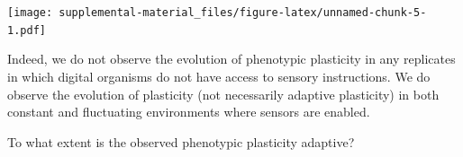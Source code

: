 \documentclass[]{book}
\newenvironment{Shaded}{\begin{snugshade}}{\end{snugshade}}
\newcommand{\DataTypeTok}[1]{\textcolor[rgb]{0.13,0.29,0.53}{#1}}
\newcommand{\FloatTok}[1]{\textcolor[rgb]{0.00,0.00,0.81}{#1}}
\newcommand{\KeywordTok}[1]{\textcolor[rgb]{0.13,0.29,0.53}{\textbf{#1}}}
\newcommand{\NormalTok}[1]{#1}
\newcommand{\OperatorTok}[1]{\textcolor[rgb]{0.81,0.36,0.00}{\textbf{#1}}}
\newcommand{\StringTok}[1]{\textcolor[rgb]{0.31,0.60,0.02}{#1}}
\begin{document}
\begin{Shaded}
\end{Shaded}

\texttt{[image: supplemental-material\_files/figure-latex/unnamed-chunk-5-1.pdf]}

Indeed, we do not observe the evolution of phenotypic plasticity in any replicates in which digital organisms do not have access to sensory instructions.
We do observe the evolution of plasticity (not necessarily adaptive plasticity) in both constant and fluctuating environments where sensors are enabled.

To what extent is the observed phenotypic plasticity adaptive?
\end{document}
